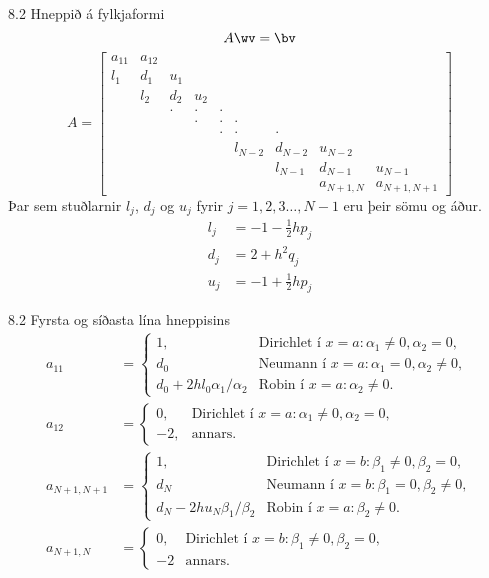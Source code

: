 \begin{frame}{8.2 Hneppið á fylkjaformi} 
$$
A\wv=\bv
$$
$$
A=\left[\begin{matrix}
a_{11}&a_{12}\\
l_1&d_1&u_1\\
&l_2&d_2&u_2\\
&&\cdot&\cdot&\cdot \\
&&&\cdot&\cdot&\cdot \\
&&&&\cdot&\cdot&\cdot \\
&&&&&l_{N-2}&d_{N-2}&u_{N-2} \\
&&&&&&l_{N-1}&d_{N-1}&u_{N-1} \\
&&&&&&&a_{N+1,N}&a_{N+1,N+1}
\end{matrix}\right]
$$
Þar sem stuðlarnir $l_j$, $d_j$ og $u_j$ fyrir 
$j=1,2,3\dots,N-1$ eru þeir sömu og áður.
\begin{align*}
  l_j&=-1-\tfrac 12 hp_j\\
d_j&=2+h^2q_j\\
u_j&=-1+\tfrac 12 hp_j
\end{align*}
\end{frame}


\begin{frame}{8.2 Fyrsta og síðasta lína hneppisins} 
  \begin{align*}
a_{11}&=
\begin{cases}
  1,&\text{Dirichlet í } x=a: \alpha_1\neq 0, \alpha_2=0,\\
d_0&\text{Neumann í } x=a:  \alpha_1=0, \alpha_2\neq 0,\\
d_0+2hl_0\alpha_1/\alpha_2&\text{Robin í } x=a:  \alpha_2\neq 0.
\end{cases} \\
a_{12}&=
\begin{cases}
  0,&\text{Dirichlet í } x=a: \alpha_1\neq 0, \alpha_2=0,\\
-2,&\text{annars}.
\end{cases}
\\ 
a_{N+1,N+1}&=
\begin{cases}
  1,&\text{Dirichlet í } x=b: \beta_1\neq 0, \beta_2=0,\\
d_N&\text{Neumann í } x=b:  \beta_1=0, \beta_2\neq 0,\\
d_N-2hu_N\beta_1/\beta_2&\text{Robin í } x=a:  \beta_2\neq 0.
\end{cases} 
\\
a_{N+1,N}&=
\begin{cases}
  0,&\text{Dirichlet í } x=b: \beta_1\neq 0, \beta_2=0,\\
-2&\text{annars}.
\end{cases} 
  \end{align*}
\end{frame}


